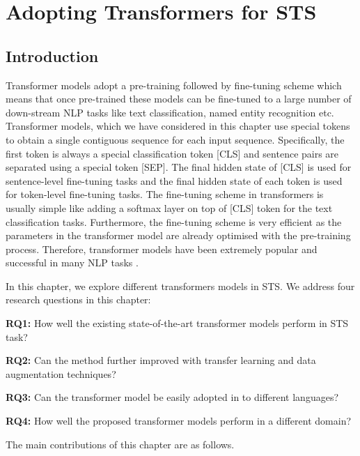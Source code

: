 \chapter{\label{cha:sts_transformers}Adopting Transformers for STS}

\section{Introduction}




Transformer models adopt a pre-training followed by fine-tuning scheme which means that once pre-trained these models can be fine-tuned to a large number of down-stream NLP tasks like text classification, named entity recognition etc.  Transformer models, which we have considered in this chapter use special tokens to obtain a single contiguous sequence for each input sequence. Specifically, the first token is always a special classification token \textsc{[CLS]} and sentence pairs are separated using a special token \textsc{[SEP]}. The final hidden state of \textsc{[CLS]}  is used for sentence-level fine-tuning tasks and the final hidden state of each token is used for token-level fine-tuning tasks. The fine-tuning scheme in transformers is usually simple like adding a softmax layer on top of \textsc{[CLS]} token for the text classification tasks. Furthermore, the fine-tuning scheme is very efficient as the parameters in the transformer model are already optimised with the pre-training process. Therefore, transformer models have been extremely popular and successful in many NLP tasks \cite{devlin-etal-2019-bert}. 

In this chapter, we explore different transformers models in STS. 
We address four research questions in this chapter:

\textbf{RQ1:} How well the existing state-of-the-art transformer models perform in STS task? 

\textbf{RQ2:} Can the method further improved with transfer learning and data augmentation techniques?

\textbf{RQ3:} Can the transformer model be easily adopted in to different languages?

\textbf{RQ4:} How well the proposed transformer models perform in a different domain? 

The main contributions of this chapter are as follows.

